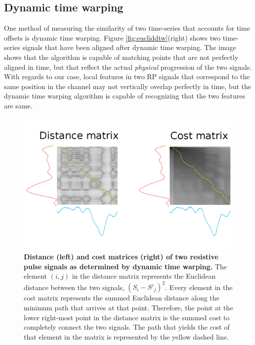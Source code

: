 		\subsection{Dynamic time warping}
		
			One method of measuring the similarity of two time-series that accounts for time offsets is dynamic time warping. Figure \ref{fig:eucliddtw}(right) shows two time-series signals that have been aligned after dynamic time warping. The image shows that the algorithm is capable of matching points that are not perfectly aligned in time, but that reflect the actual \textit{physical} progression of the two signals. With regards to our case, local features in two RP signals that correspond to the same position in the channel may not vertically overlap perfectly in time, but the dynamic time warping algorithm is capable of recognizing that the two features are same. 
			
			\begin{figure}
				\includegraphics[width=\textwidth]{distancecost}
				\caption{\textbf{Distance (left) and cost matrices (right) of two resistive pulse signals as determined by dynamic time warping.} The element $\left(i,j\right)$ in the distance matrix represents the Euclidean distance between the two signals, $\left(S_{i}-S'_{j}\right)^{2}$. Every element in the cost matrix represents the summed Euclidean distance along the minimum path that arrives at that point. Therefore, the point at the lower right-most point in the distance matrix is the summed cost to completely connect the two signals. The path that yields the cost of that element in the matrix is represented by the yellow dashed line.}
				\label{fig:distancecost}
			\end{figure}

